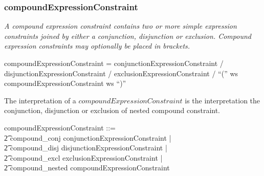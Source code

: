 \documentclass{article}
\def\bnf#1{{\scriptsize {{#1}} }}
\def\desc#1{{\small \textsl{{#1}} }}
\begin{document}
\subsubsection{compoundExpressionConstraint}
\begin{framed}
\desc{A compound expression constraint contains two or more simple expression constraints joined by either a conjunction, disjunction or exclusion. Compound expression constraints may optionally be placed in brackets.}
\end{framed}

\begin{framed}
\noindent
\bnf{	compoundExpressionConstraint = conjunctionExpressionConstraint / 
                               disjunctionExpressionConstraint / 
                               exclusionExpressionConstraint / 			
                               ``('' ws compoundExpressionConstraint ws ``)''}
\end{framed}

The interpretation of a $compoundExpressionConstraint$ is the interpretation the conjunction, disjunction or exclusion of nested compound constraint.

\begin{zed}
compoundExpressionConstraint ::= \\
\t2 compound\_conj \ldata conjunctionExpressionConstraint \rdata | \\
\t2 compound\_disj \ldata disjunctionExpressionConstraint \rdata | \\
\t2 compound\_excl \ldata exclusionExpressionConstraint \rdata | \\
\t2 compound\_nested \ldata compoundExpressionConstraint \rdata \\
[compoundExpressionConstraint']
\end{zed}
\end{document}
